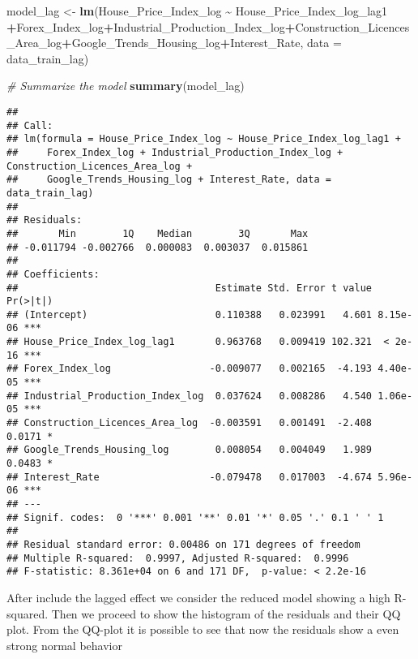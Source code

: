 \documentclass[
]{article}
\newenvironment{Shaded}{\begin{snugshade}}{\end{snugshade}}
\newcommand{\AttributeTok}[1]{\textcolor[rgb]{0.13,0.29,0.53}{#1}}
\newcommand{\CommentTok}[1]{\textcolor[rgb]{0.56,0.35,0.01}{\textit{#1}}}
\newcommand{\FunctionTok}[1]{\textcolor[rgb]{0.13,0.29,0.53}{\textbf{#1}}}
\newcommand{\NormalTok}[1]{#1}
\newcommand{\OtherTok}[1]{\textcolor[rgb]{0.56,0.35,0.01}{#1}}
\newcommand{\SpecialCharTok}[1]{\textcolor[rgb]{0.81,0.36,0.00}{\textbf{#1}}}
\begin{document}
\begin{Shaded}
\begin{Highlighting}[]
\NormalTok{model\_lag }\OtherTok{\textless{}{-}} \FunctionTok{lm}\NormalTok{(House\_Price\_Index\_log }\SpecialCharTok{\textasciitilde{}}\NormalTok{ House\_Price\_Index\_log\_lag1 }\SpecialCharTok{+}\NormalTok{Forex\_Index\_log}\SpecialCharTok{+}\NormalTok{Industrial\_Production\_Index\_log}\SpecialCharTok{+}\NormalTok{Construction\_Licences\_Area\_log}\SpecialCharTok{+}\NormalTok{Google\_Trends\_Housing\_log}\SpecialCharTok{+}\NormalTok{Interest\_Rate, }\AttributeTok{data =}\NormalTok{ data\_train\_lag)}

\CommentTok{\# Summarize the model}
\FunctionTok{summary}\NormalTok{(model\_lag)}
\end{Highlighting}
\end{Shaded}

\begin{verbatim}
## 
## Call:
## lm(formula = House_Price_Index_log ~ House_Price_Index_log_lag1 + 
##     Forex_Index_log + Industrial_Production_Index_log + Construction_Licences_Area_log + 
##     Google_Trends_Housing_log + Interest_Rate, data = data_train_lag)
## 
## Residuals:
##       Min        1Q    Median        3Q       Max 
## -0.011794 -0.002766  0.000083  0.003037  0.015861 
## 
## Coefficients:
##                                  Estimate Std. Error t value Pr(>|t|)    
## (Intercept)                      0.110388   0.023991   4.601 8.15e-06 ***
## House_Price_Index_log_lag1       0.963768   0.009419 102.321  < 2e-16 ***
## Forex_Index_log                 -0.009077   0.002165  -4.193 4.40e-05 ***
## Industrial_Production_Index_log  0.037624   0.008286   4.540 1.06e-05 ***
## Construction_Licences_Area_log  -0.003591   0.001491  -2.408   0.0171 *  
## Google_Trends_Housing_log        0.008054   0.004049   1.989   0.0483 *  
## Interest_Rate                   -0.079478   0.017003  -4.674 5.96e-06 ***
## ---
## Signif. codes:  0 '***' 0.001 '**' 0.01 '*' 0.05 '.' 0.1 ' ' 1
## 
## Residual standard error: 0.00486 on 171 degrees of freedom
## Multiple R-squared:  0.9997, Adjusted R-squared:  0.9996 
## F-statistic: 8.361e+04 on 6 and 171 DF,  p-value: < 2.2e-16
\end{verbatim}

After include the lagged effect we consider the reduced model showing a
high R-squared. Then we proceed to show the histogram of the residuals
and their QQ plot. From the QQ-plot it is possible to see that now the
residuals show a even strong normal behavior
\end{document}
